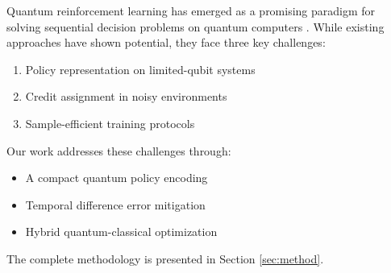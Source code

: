 Quantum reinforcement learning has emerged as a promising paradigm for solving sequential decision problems on quantum computers \cite{dong2022quantum}. While existing approaches have shown potential, they face three key challenges:

\begin{enumerate}
    \item Policy representation on limited-qubit systems
    \item Credit assignment in noisy environments
    \item Sample-efficient training protocols
\end{enumerate}

Our work addresses these challenges through:

\begin{itemize}
    \item A compact quantum policy encoding
    \item Temporal difference error mitigation
    \item Hybrid quantum-classical optimization
\end{itemize}

The complete methodology is presented in Section \ref{sec:method}.

